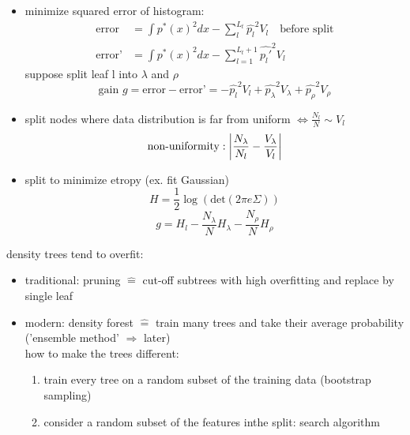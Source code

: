 \documentclass[11pt]{article}
\DeclarePairedDelimiter\abs{\lvert}{\rvert}
\begin{document}
              \begin{itemize}
                \item minimize squared error of histogram:
                \begin{equation*}
                  \begin{align*}
                  \text{error} &= \int p^*(x)^2dx - \sum_l^{L_t} \hat{p_l}^2 V_l \quad \text{before split} \\
                  \text{error'} &= \int p^*(x)^2dx - \sum_{l=1}^{L_t+1} \hat{p_l'}^2 V_l
                  \end{align*}
                \end{equation*}
                suppose split leaf l into $\lambda$ and $\rho$
                \begin{equation*}
                  \text{gain } g = \text{error}-\text{error'} = -\hat{p_l}^2V_l+\hat{p_{\lambda}}^2 V_{\lambda}+\hat{p_{\rho}}^2 V_{\rho}
                \end{equation*}
                \item split nodes where data distribution is far from uniform $\iff \frac{N_l}{N} \sim V_l$
                \begin{equation*}
                  \text{non-uniformity}: \abs*{\frac{N_{\lambda}}{N_l} - \frac{V_{\lambda}}{V_l}}
                \end{equation*}
                \item split to minimize etropy (ex. fit Gaussian)
                \begin{equation*}
                  H = \frac{1}{2} \log(\text{det}(2\pi e \Sigma))
                \end{equation*}
                \begin{equation*}
                  g = H_l - \frac{N_{\lambda}}{N}H_{\lambda}-\frac{N_{\rho}}{N}H_{\rho}
                \end{equation*}
              \end{itemize}
              density trees tend to overfit:
              \begin{itemize}
                \item traditional: pruning $\widehat{=}$ cut-off subtrees with high overfitting and replace by single leaf
                \item modern: density forest $\widehat{=}$ train many trees and take their average probability ('ensemble method' $\Rightarrow$ later) \\
                how to make the trees different:
                \begin{enumerate}
                  \item train every tree on a random subset of the training data (bootstrap sampling)
                  \item consider a random subset of the features inthe split: search algorithm
                \end{enumerate}
              \end{itemize}
\end{document}
